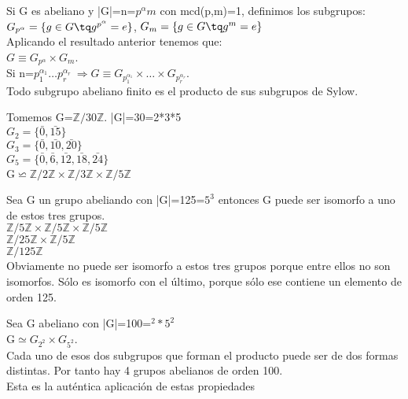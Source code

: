 \documentclass[nochap]{apuntes}
\begin{document}
\begin{example}
 Si G es abeliano y |G|=n=$p^{\alpha}m$  con mcd(p,m)=1, definimos los subgrupos:\\
 $G_{p^{\alpha}}=\{g\in G \tq g^{p^{\alpha}}=e\}$, $G_m=\{g \in G \tq g^{m}=e\}$\\
 Aplicando el resultado anterior tenemos que:\\
 $G\equiv G_{p^{\alpha}} \times G_m$.\\
 Si n=$p_1^{\alpha_1}\dots p_r^{\alpha_r} \ \Rightarrow G\equiv G_{p_1^{\alpha_1}}\times \dots \times G_{p_r^{\alpha_r}}$.\\
 Todo subgrupo abeliano finito es el producto de sus subgrupos de Sylow.
\end{example}

\begin{example}
 Tomemos G=$\mathbb{Z}/30\mathbb{Z}$. |G|=30=2*3*5\\
 $G_2=\{\bar{0}, \bar{15}\}$\\
 $G_3=\{\bar{0}, \bar{10}, \bar{20}\}$\\
 $G_5=\{\bar{0}, \bar{6}, \bar{12}, \bar{18}, \bar{24}\}$\\
 G$\backsimeq \mathbb{Z}/2\mathbb{Z}\times\mathbb{Z}/3\mathbb{Z}\times\mathbb{Z}/5\mathbb{Z}$
\end{example}

\begin{example}
 Sea G un grupo abeliando con |G|=125=$5^{3}$  entonces G puede ser isomorfo a uno de estos tres grupos.\\
 $\mathbb{Z}/5\mathbb{Z}\times \mathbb{Z}/5\mathbb{Z} \times \mathbb{Z}/5\mathbb{Z}$\\
 $\mathbb{Z}/25\mathbb{Z}\times\mathbb{Z}/5\mathbb{Z}$\\
 $\mathbb{Z}/125\mathbb{Z}$\\
 Obviamente no puede ser isomorfo a estos tres grupos porque entre ellos no son isomorfos. Sólo es isomorfo con el último, porque sólo
 ese contiene un elemento de orden 125.
\end{example}

\begin{example}
 Sea G abeliano con |G|=100=$^{2}*5^{2}$\\
 G$\simeq G_{2^{2}} \times G_{5^{2}}$.\\
 Cada uno de esos dos subgrupos que forman el producto puede ser de dos formas distintas. Por tanto hay 4 grupos abelianos de orden 100.\\
 Esta es la auténtica aplicación de estas propiedades
\end{example}
\newpage
\end{document}
